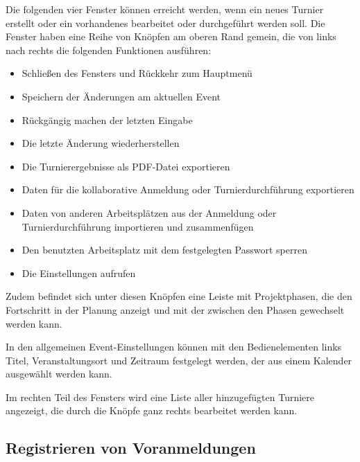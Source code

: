 \documentclass[11pt]{article}
\begin{document}
\vspace{1cm}

Die folgenden vier Fenster können erreicht werden, wenn ein neues Turnier erstellt oder ein vorhandenes bearbeitet oder durchgeführt werden soll. Die Fenster haben eine Reihe von Knöpfen am oberen Rand gemein, die von links nach rechts die folgenden Funktionen ausführen:
\newpage
\begin{itemize}
	\item Schließen des Fensters und Rückkehr zum Hauptmenü
	\item Speichern der Änderungen am aktuellen Event
	\item Rückgängig machen der letzten Eingabe
	\item Die letzte Änderung wiederherstellen
	\item Die Turnierergebnisse als PDF-Datei exportieren
	\item Daten für die kollaborative Anmeldung oder Turnierdurchführung exportieren
	\item Daten von anderen Arbeitsplätzen aus der Anmeldung oder Turnierdurchführung importieren und zusammenfügen
	\item Den benutzten Arbeitsplatz mit dem festgelegten Passwort sperren
	\item Die Einstellungen aufrufen
\end{itemize}
Zudem befindet sich unter diesen Knöpfen eine Leiste mit Projektphasen, die den Fortschritt in der Planung anzeigt und mit der zwischen den Phasen gewechselt werden kann.

In den allgemeinen Event-Einstellungen können mit den Bedienelementen links Titel, Veranstaltungsort und Zeitraum festgelegt werden, der aus einem Kalender ausgewählt werden kann.

Im rechten Teil des Fensters wird eine Liste aller hinzugefügten Turniere angezeigt, die durch die Knöpfe ganz rechts bearbeitet werden kann.

\subsection{Registrieren von Voranmeldungen}

\end{document}
